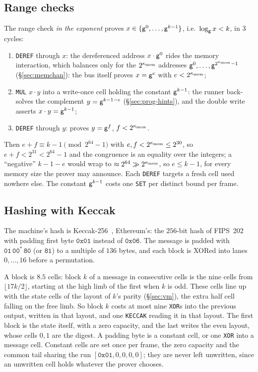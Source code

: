 \subsection{Range checks}\label{sec:prog-range-checks}

The range check \emph{in the exponent} proves $x\in\{\mathsf{g}^{0},\dots,\mathsf{g}^{k-1}\}$, i.e.\ $\log_{\mathsf{g}}x<k$, in 3 cycles:
\begin{enumerate}
\item \texttt{DEREF} through $x$: the dereferenced address $x\cdot\mathsf{g}^{0}$ rides the memory interaction, which balances only for the $2^{\kappa_{\mathrm{mem}}}$ addresses $\mathsf{g}^{0},\dots,\mathsf{g}^{2^{\kappa_{\mathrm{mem}}}-1}$ (\S\ref{sec:memchan}): the bus itself proves $x=\mathsf{g}^{e}$ with $e<2^{\kappa_{\mathrm{mem}}}$;
\item \texttt{MUL} $x\cdot y$ into a write-once cell holding the constant $\mathsf{g}^{k-1}$: the runner back-solves the complement $y=\mathsf{g}^{k-1-e}$ (\S\ref{sec:prog-hints}), and the double write asserts $x\cdot y=\mathsf{g}^{k-1}$;
\item \texttt{DEREF} through $y$: proves $y=\mathsf{g}^{f}$, $f<2^{\kappa_{\mathrm{mem}}}$.
\end{enumerate}
Then $e+f\equiv k-1\pmod{2^{64}-1}$ with $e,f<2^{\kappa_{\mathrm{mem}}}\le2^{30}$, so $e+f<2^{31}<2^{64}-1$ and the congruence is an equality over the integers; a ``negative'' $k-1-e$ would wrap to $\approx2^{64}\gg2^{\kappa_{\mathrm{mem}}}$, so $e\le k-1$, for every memory size the prover may announce. Each \texttt{DEREF} targets a fresh cell used nowhere else. The constant $\mathsf{g}^{k-1}$ costs one \texttt{SET} per distinct bound per frame.

\subsection{Hashing with Keccak}\label{sec:prog-hashing}

The machine's hash is Keccak-256~\cite{keccak}, Ethereum's: the $256$-bit hash of FIPS~202~\cite{fips202} with padding first byte $\mathtt{0x01}$ instead of $\mathtt{0x06}$. The message is padded with $\mathtt{01}\,\mathtt{00}^{*}\,\mathtt{80}$ (or $\mathtt{81}$) to a multiple of $136$ bytes, and each block is XORed into lanes $0,\dots,16$ before a permutation.

A block is $8.5$ cells: block $k$ of a message in consecutive cells is the nine cells from $\lfloor17k/2\rfloor$, starting at the high limb of the first when $k$ is odd. These cells line up with the state cells of the layout of $k$'s parity (\S\ref{sec:vm}), the extra half cell falling on the free limb. So block $k$ costs at most nine \texttt{XOR}s into the previous output, written in that layout, and one \texttt{KECCAK} reading it in that layout. The first block is the state itself, with a zero capacity, and the last writes the even layout, whose cells $0,1$ are the digest. A padding byte is a constant cell, or one \texttt{XOR} into a message cell. Constant cells are set once per frame, the zero capacity and the common tail sharing the run $[\mathtt{0x01},0,0,0,0]$; they are never left unwritten, since an unwritten cell holds whatever the prover chooses.

